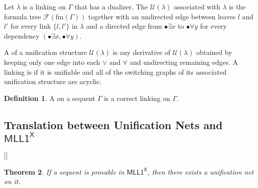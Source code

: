 \documentclass[conference,twosided,10pt]{IEEEtran}
\newcommand{\todo}[1]{{\color{red}     \noindent[\![\![{\bf TODO: }#1]\!]\!]}}
\newtheorem{thm}{Theorem}%
\theoremstyle{definition}
\newtheorem{definition}[thm]{Definition}
\newcommand*{\FOMLL}{\mathsf{MLL1^X}}
\newcommand{\cor}{\vee}
\newcommand{\single}[1]{\bullet#1}
\newcommand{\form}[1]{\mathrm{fm}(#1)}
\newcommand{\formtree}[1]{\mathcal{F}(#1)}
\newcommand{\unifstr}[1]{\mathcal{U}(#1)}
\begin{document}
Let $\lambda$ is a linking on $\Gamma$ that has a dualizer.
The  $\unifstr{\lambda}$
associated with $\lambda$ is the formula tree $\formtree{\form{\Gamma}}$ together with an undirected
edge between leaves $l$ and $l'$ for every link $\{l, l'\}$ in $\lambda$ and a
directed edge from $\single \exists x$ to $\single \forall y$ for every
dependency $(\single \exists x, \single \forall y)$.

A  of a unification structure $\unifstr{\lambda}$ is any
derivative of $\unifstr{\lambda}$ obtained by keeping only one edge into each $\cor$
and $\forall$ and undirecting remaining edges. A linking is  if it
is unifiable and all of the switching graphs of its associated unification
structure are acyclic.

\begin{definition}
  A  on a sequent $\Gamma$ is a correct linking on $\Gamma$.
\end{definition}

\subsection{Translation between Unification Nets and $\FOMLL$}

\todo{}
\begin{thm}\label{thm:MLL1->Unet}
  If a sequent is provable in $\FOMLL$, then there exists a unification net
  on it.
\end{thm}
\end{document}

